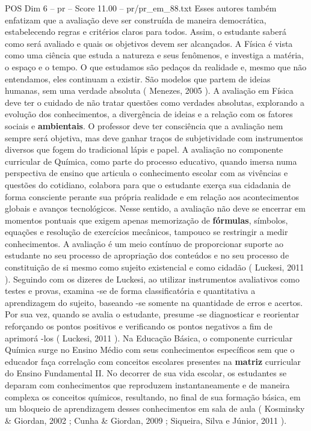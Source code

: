 \begin{textsample}{POS Dim 6 – pr – Score 11.00 – pr/pr\_em\_88.txt}
Esses autores também enfatizam que a avaliação deve ser construída de maneira democrática, estabelecendo regras e critérios claros para todos.
Assim, o estudante saberá como será avaliado e quais os objetivos devem ser alcançados.
A Física é vista como uma ciência que estuda a natureza e seus fenômenos, e investiga a matéria, o espaço e o tempo.
O que estudamos são pedaços da realidade e, mesmo que não entendamos, eles continuam a existir.
São modelos que partem de ideias humanas, sem uma verdade absoluta ( Menezes, 2005 ).
A avaliação em Física deve ter o cuidado de não tratar questões como verdades absolutas, explorando a evolução dos conhecimentos, a divergência de ideias e a relação com os fatores sociais e \textbf{ambientais}.
O professor deve ter consciência que a avaliação nem sempre será objetiva, mas deve ganhar traços de subjetividade com instrumentos diversos que fogem do tradicional lápis e papel.
A avaliação no componente curricular de Química, como parte do processo educativo, quando imersa numa perspectiva de ensino que articula o conhecimento escolar com as vivências e questões do cotidiano, colabora para que o estudante exerça sua cidadania de forma consciente perante sua própria realidade e em relação aos acontecimentos globais e avanços tecnológicos.
Nesse sentido, a avaliação não deve se encerrar em momentos pontuais que exigem apenas memorização de \textbf{fórmulas}, símbolos, equações e resolução de exercícios mecânicos, tampouco se restringir a medir conhecimentos.
A avaliação é um meio contínuo de proporcionar suporte ao estudante no seu processo de apropriação dos conteúdos e no seu processo de constituição de si mesmo como sujeito existencial e como cidadão ( Luckesi, 2011 ).
Seguindo com os dizeres de Luckesi, ao utilizar instrumentos avaliativos como testes e provas, examina -se de forma classificatória e quantitativa a aprendizagem do sujeito, baseando -se somente na quantidade de erros e acertos.
Por sua vez, quando se avalia o estudante, presume -se diagnosticar e reorientar reforçando os pontos positivos e verificando os pontos negativos a fim de aprimorá -los ( Luckesi, 2011 ).
Na Educação Básica, o componente curricular Química surge no Ensino Médio com seus conhecimentos específicos sem que o educador faça correlação com conceitos escolares presentes na \textbf{matriz} curricular do Ensino Fundamental II.
No decorrer de sua vida escolar, os estudantes se deparam com conhecimentos que reproduzem instantaneamente e de maneira complexa os conceitos químicos, resultando, no final de sua formação básica, em um bloqueio de aprendizagem desses conhecimentos em sala de aula ( Kosminsky \& Giordan, 2002 ; Cunha \& Giordan, 2009 ; Siqueira, Silva e Júnior, 2011 ).

\end{textsample}

